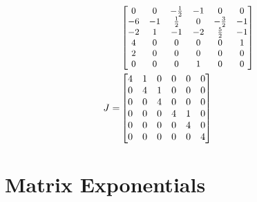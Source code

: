 \begin{solution}
\begin{align*}
& \small\begin{bmatrix}
0 & 0 & -\frac{1}{2} & -1 & 0 & 0 \\
-6 & -1 & \frac{1}{2} & 0 & -\frac{3}{2} & -1\\
-2 & 1 & -1 & -2 & \frac{5}{2} & -1\\
4 & 0 & 0 & 0 & 0 & 1\\
2 & 0 & 0 & 0 & 0 & 0\\
0 & 0 & 0 & 1 & 0 & 0
\end{bmatrix} \\
J =&
\begin{bmatrix}
4&1&0&0&0&0\\ 
0&4&1&0&0&0\\ 
0&0&4&0&0&0\\ 
0&0&0&4&1&0\\ 
0&0&0&0&4&0\\ 
0&0&0&0&0&4
\end{bmatrix}
\end{align*}
\end{solution}

\section{Matrix Exponentials}
\label{sec:matexp}

